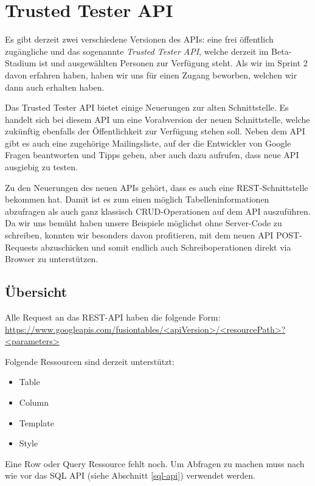 \section{Trusted Tester API}
\label{trusted-tester-api}
Es gibt derzeit zwei verschiedene Versionen des APIs: eine frei öffentlich zugängliche und das sogenannte \emph{Trusted Tester API}, welche derzeit im Beta-Stadium ist und ausgewählten Personen zur Verfügung steht. Als wir im Sprint 2 davon erfahren haben, haben wir uns für einen Zugang beworben, welchen wir dann auch erhalten haben.

Das Trusted Tester API bietet einige Neuerungen zur alten Schnittstelle. Es handelt sich bei diesem API um eine Vorabversion der neuen Schnittstelle, welche zukünftig ebenfalls der Öffentlichkeit zur Verfügung stehen soll. Neben dem API gibt es auch eine zugehörige Mailingsliste, auf der die Entwickler von Google Fragen beantworten und Tipps geben, aber auch dazu aufrufen, dass neue API ausgiebig zu testen.

Zu den Neuerungen des neuen APIs gehört, dass es auch eine \gls{REST}-Schnittstelle bekommen hat. Damit ist es zum einen möglich Tabelleninformationen abzufragen als auch ganz klassisch CRUD-Operationen auf dem API auszuführen. Da wir uns bemüht haben unsere Beispiele möglichst ohne Server-Code zu schreiben, konnten wir besonders davon profitieren, mit dem neuen API POST-Requests abzuschicken und somit endlich auch Schreiboperationen direkt via Browser zu unterstützen. 

\subsection{Übersicht}
Alle Request an das \gls{REST}-API haben die folgende Form:
\url{https://www.googleapis.com/fusiontables/<apiVersion>/<resourcePath>?<parameters>}

Folgende Ressourcen sind derzeit unterstützt:
\begin{itemize}
	\item Table
	\item Column
	\item Template
	\item Style
\end{itemize}

Eine Row oder Query Ressource fehlt noch. Um Abfragen zu machen muss nach wie vor das SQL API (siehe Abschnitt \ref{sql-api}) verwendet werden.

